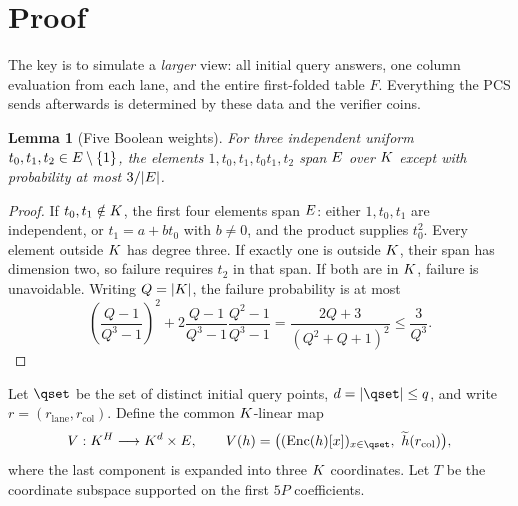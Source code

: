 \documentclass[11pt]{article}
\newtheorem{lemma}[theorem]{Lemma}
\begin{document}
\section{Proof}

The key is to simulate a \emph{larger} view: all initial query answers, one column evaluation from each lane, and the entire first-folded table $F$. Everything the PCS sends afterwards is determined by these data and the verifier coins.

\begin{lemma}[Five Boolean weights]\label{lem:five}
For three independent uniform $t_0,t_1,t_2\in E\setminus\{1\}$, the elements $1,t_0,t_1,t_0t_1,t_2$ span $E$ over $K$ except with probability at most $3/|E|$.
\end{lemma}
\begin{proof}
If $t_0,t_1\notin K$, the first four elements span $E$: either $1,t_0,t_1$ are independent, or $t_1=a+bt_0$ with $b\ne0$, and the product supplies $t_0^2$. Every element outside $K$ has degree three. If exactly one is outside $K$, their span has dimension two, so failure requires $t_2$ in that span. If both are in $K$, failure is unavoidable. Writing $Q=|K|$, the failure probability is at most
\[
 \left(\frac{Q-1}{Q^3-1}\right)^2
 +2\frac{Q-1}{Q^3-1}\frac{Q^2-1}{Q^3-1}
 =\frac{2Q+3}{(Q^2+Q+1)^2}
 \le\frac3{Q^3}.
\]
\end{proof}

Let $\qset$ be the set of distinct initial query points, $d=|\qset|\le q$, and write $r=(r_{\mathrm{lane}},r_{\mathrm{col}})$. Define the common $K$-linear map
\[
 V:\K^H\longrightarrow\K^d\times\E,
 \qquad V(h)=\bigl((\Enc(h)[x])_{x\in\qset},\ \mle h(r_{\mathrm{col}})\bigr),
\]
where the last component is expanded into three $K$ coordinates. Let $T$ be the coordinate subspace supported on the first $5P$ coefficients.
\end{document}
